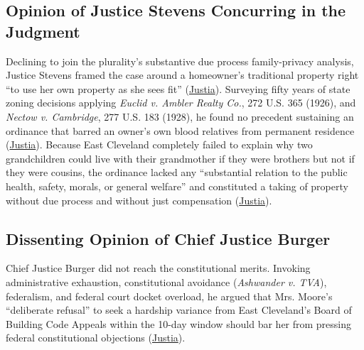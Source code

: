 \documentclass[12pt]{article}
\begin{document}
\subsection{Opinion of Justice Stevens Concurring in the Judgment}
Declining to join the plurality's substantive due process family-privacy analysis, Justice Stevens framed the case around a homeowner's traditional property right ``to use her own property as she sees fit'' (\href{https://supreme.justia.com/cases/federal/us/431/494/}{Justia}). Surveying fifty years of state zoning decisions applying \textit{Euclid v. Ambler Realty Co.}, 272 U.S. 365 (1926), and \textit{Nectow v. Cambridge}, 277 U.S. 183 (1928), he found no precedent sustaining an ordinance that barred an owner's own blood relatives from permanent residence (\href{https://supreme.justia.com/cases/federal/us/431/494/}{Justia}). Because East Cleveland completely failed to explain why two grandchildren could live with their grandmother if they were brothers but not if they were cousins, the ordinance lacked any ``substantial relation to the public health, safety, morals, or general welfare'' and constituted a taking of property without due process and without just compensation (\href{https://supreme.justia.com/cases/federal/us/431/494/}{Justia}).

\subsection{Dissenting Opinion of Chief Justice Burger}
Chief Justice Burger did not reach the constitutional merits. Invoking administrative exhaustion, constitutional avoidance (\textit{Ashwander v. TVA}), federalism, and federal court docket overload, he argued that Mrs. Moore's ``deliberate refusal'' to seek a hardship variance from East Cleveland's Board of Building Code Appeals within the 10-day window should bar her from pressing federal constitutional objections (\href{https://supreme.justia.com/cases/federal/us/431/494/}{Justia}).
\end{document}
